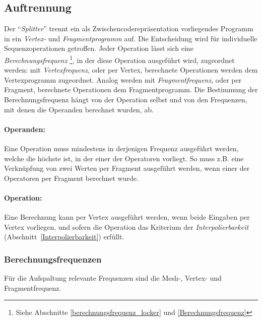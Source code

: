 \documentclass[twoside,a4paper,fleqn,12pt]{article}
\begin{document}
\subsection{Auftrennung}
\label{Auftrennung}

Der "`\emph{Splitter}"' trennt ein als Zwischencoderepräsentation vorliegendes Programm in ein \emph{Vertex-} und \emph{Fragmentprogramm} auf.
Die Entscheidung wird für individuelle Sequenzoperationen getroffen. Jeder Operation lässt sich eine \emph{Berechnungsfrequenz}
\footnote{Siehe Abschnitte \ref{berechnungsfrequenz_locker} und \ref{Berechnungsfrequenz}},
in der diese Operation ausgeführt wird, zugeordnet werden: mit \emph{Vertexfrequenz}, oder per Vertex, berechnete Operationen werden dem Vertexprogramm zugeordnet.
Analog werden mit \emph{Fragmentfrequenz}, oder per Fragment, berechnete Operationen dem Fragmentprogramm. Die Bestimmung der Berechnungsfrequenz hängt von der Operation selbst
und von den Frequenzen, mit denen die Operanden berechnet wurden, ab. 

\paragraph{Operanden:} Eine Operation muss mindestens in derjenigen Frequenz ausgeführt werden, welche die höchste ist, in der einer der Operatoren
vorliegt. So muss z.B. eine Verknüpfung von zwei Werten per Fragment ausgeführt werden, wenn einer der Operatoren per Fragment berechnet wurde.

\paragraph{Operation:} Eine Berechnung kann per Vertex ausgeführt werden, wenn beide Eingaben per Vertex vorliegen, und
sofern die Operation das Kriterium der \emph{Interpolierbarkeit} (Abschnitt~\ref{Interpolierbarkeit}) erfüllt.

\subsubsection{Berechnungsfrequenzen}
\label{splitter_Berechnungsfrequenzen}

Für die Aufspaltung relevante Frequenzen sind die Mesh-, %
Vertex- und Fragmentfrequenz.
\end{document}
